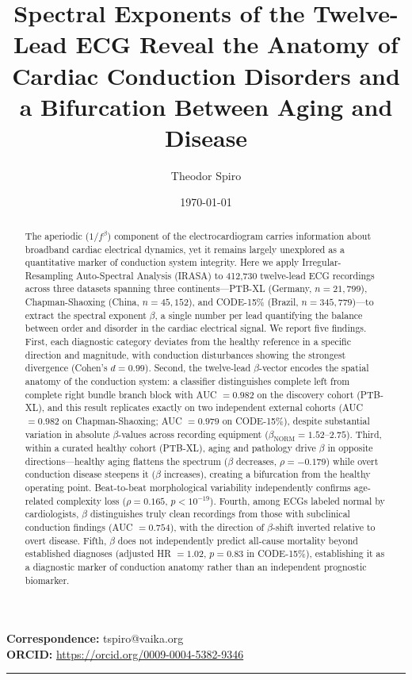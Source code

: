 \documentclass[11pt,a4paper]{article}
\title{\Large\textbf{Spectral Exponents of the Twelve-Lead ECG Reveal the Anatomy of Cardiac Conduction Disorders and a Bifurcation Between Aging and Disease}}
\author[1]{Theodor Spiro}
\affil[1]{Independent Researcher, Paris, France}
\date{\today}
\begin{document}
\maketitle
\noindent\textbf{Correspondence:} tspiro@vaika.org\\
\noindent\textbf{ORCID:} \url{https://orcid.org/0009-0004-5382-9346}
\vspace{1em}
\hrule
\vspace{1em}
\begin{abstract}
\noindent
The aperiodic ($1/f^\beta$) component of the electrocardiogram carries information about broadband cardiac electrical dynamics, yet it remains largely unexplored as a quantitative marker of conduction system integrity. Here we apply Irregular-Resampling Auto-Spectral Analysis (IRASA) to 412,730 twelve-lead ECG recordings across three datasets spanning three continents---PTB-XL (Germany, $n = 21{,}799$), Chapman-Shaoxing (China, $n = 45{,}152$), and CODE-15\% (Brazil, $n = 345{,}779$)---to extract the spectral exponent $\beta$, a single number per lead quantifying the balance between order and disorder in the cardiac electrical signal.
We report five findings. First, each diagnostic category deviates from the healthy reference in a specific direction and magnitude, with conduction disturbances showing the strongest divergence (Cohen's $d = 0.99$). Second, the twelve-lead $\beta$-vector encodes the spatial anatomy of the conduction system: a classifier distinguishes complete left from complete right bundle branch block with AUC $= 0.982$ on the discovery cohort (PTB-XL), and this result replicates exactly on two independent external cohorts (AUC $= 0.982$ on Chapman-Shaoxing; AUC $= 0.979$ on CODE-15\%), despite substantial variation in absolute $\beta$-values across recording equipment ($\beta_\text{NORM} = 1.52$--$2.75$). Third, within a curated healthy cohort (PTB-XL), aging and pathology drive $\beta$ in opposite directions---healthy aging flattens the spectrum ($\beta$ decreases, $\rho = -0.179$) while overt conduction disease steepens it ($\beta$ increases), creating a bifurcation from the healthy operating point. Beat-to-beat morphological variability independently confirms age-related complexity loss ($\rho = 0.165$, $p < 10^{-19}$). Fourth, among ECGs labeled normal by cardiologists, $\beta$ distinguishes truly clean recordings from those with subclinical conduction findings (AUC $= 0.754$), with the direction of $\beta$-shift inverted relative to overt disease. Fifth, $\beta$ does not independently predict all-cause mortality beyond established diagnoses (adjusted HR $= 1.02$, $p = 0.83$ in CODE-15\%), establishing it as a diagnostic marker of conduction anatomy rather than an independent prognostic biomarker.

\end{abstract}
\end{document}
